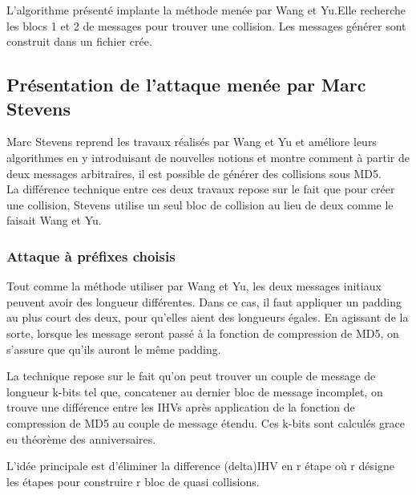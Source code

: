 \documentclass[a4paper,11pt,french]{article}
\begin{document}
L'algorithme présenté implante la méthode menée par Wang et Yu.Elle recherche les blocs 1 et 2 de messages pour trouver une collision. Les messages générer sont construit dans un fichier crée.

\subsection{Présentation de l'attaque menée par Marc Stevens}
Marc Stevens reprend les travaux réalisés par Wang et Yu et améliore leurs algorithmes en y introduisant de nouvelles notions et montre comment à partir de deux messages arbitraires, il est possible de générer des collisions sous MD5.\\

La différence technique entre ces deux travaux repose sur le fait que pour créer une collision, Stevens utilise un seul bloc de collision au lieu de deux comme le faisait Wang et Yu. 

\subsubsection{Attaque à préfixes choisis}
Tout comme la méthode utiliser par Wang et Yu, les deux messages initiaux peuvent avoir des longueur différentes. Dans ce cas, il faut appliquer un padding au plus court des deux, pour qu'elles aient des longueurs égales. En agissant de la sorte, lorsque les message seront passé à la fonction de compression de MD5, on s'assure que qu'ils auront le même padding.

La technique repose sur le fait qu'on peut trouver un couple de message de longueur k-bits tel que, concatener au dernier bloc de message incomplet, on trouve une différence entre les IHVs après application de la fonction de compression de MD5 au couple de message étendu. Ces k-bits sont calculés grace eu théorème des anniversaires.

L'idée principale est d'éliminer la difference (delta)IHV en r étape où r désigne les étapes pour construire r bloc de quasi collisions.
\end{document}
